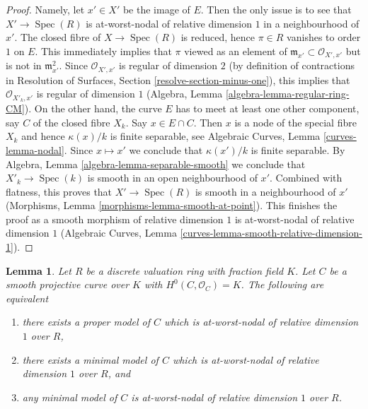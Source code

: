 \documentclass{stacks-project}
\theoremstyle{plain}
\newtheorem{lemma}[subsection]{Lemma}
\theoremstyle{definition}
\theoremstyle{remark}
\numberwithin{equation}{subsection}
\def\Spec{\mathop{\mathrm{Spec}}}
\begin{document}
\begin{proof}
Namely, let $x' \in X'$ be the image of $E$.
Then the only issue is to see that $X' \to \Spec(R)$
is at-worst-nodal of relative dimension $1$
in a neighbourhood of $x'$.
The closed fibre of $X \to \Spec(R)$ is reduced, hence
$\pi \in R$ vanishes to order $1$ on $E$.
This immediately implies that
$\pi$ viewed as an element of
$\mathfrak m_{x'} \subset \mathcal{O}_{X', x'}$ but
is not in $\mathfrak m_{x'}^2$.
Since $\mathcal{O}_{X', x'}$ is regular of
dimension $2$ (by definition of contractions in
Resolution of Surfaces, Section \ref{resolve-section-minus-one}),
this implies that $\mathcal{O}_{X'_k, x'}$
is regular of dimension $1$
(Algebra, Lemma \ref{algebra-lemma-regular-ring-CM}).
On the other hand, the curve $E$ has to meet at
least one other component, say $C$ of the closed fibre $X_k$.
Say $x \in E \cap C$. Then $x$ is a node of the special
fibre $X_k$ and hence $\kappa(x)/k$ is finite separable,
see Algebraic Curves, Lemma \ref{curves-lemma-nodal}.
Since $x \mapsto x'$ we conclude that $\kappa(x')/k$
is finite separable.
By Algebra, Lemma \ref{algebra-lemma-separable-smooth}
we conclude that $X'_k \to \Spec(k)$ is smooth
in an open neighbourhood of $x'$.
Combined with flatness, this proves that
$X' \to \Spec(R)$ is smooth in a neighbourhood of $x'$
(Morphisms, Lemma \ref{morphisms-lemma-smooth-at-point}).
This finishes the proof as a smooth morphism of
relative dimension $1$ is at-worst-nodal of relative
dimension $1$
(Algebraic Curves, Lemma \ref{curves-lemma-smooth-relative-dimension-1}).
\end{proof}

\begin{lemma}
\label{lemma-semistable}
Let $R$ be a discrete valuation ring with fraction field $K$.
Let $C$ be a smooth projective curve over $K$ with $H^0(C, \mathcal{O}_C) = K$.
The following are equivalent
\begin{enumerate}
\item there exists a proper model of $C$ which is
at-worst-nodal of relative dimension $1$ over $R$,
\item there exists a minimal model of $C$ which is at-worst-nodal
of relative dimension $1$ over $R$, and
\item any minimal model of $C$ is at-worst-nodal
of relative dimension $1$ over $R$.
\end{enumerate}
\end{lemma}
\end{document}
